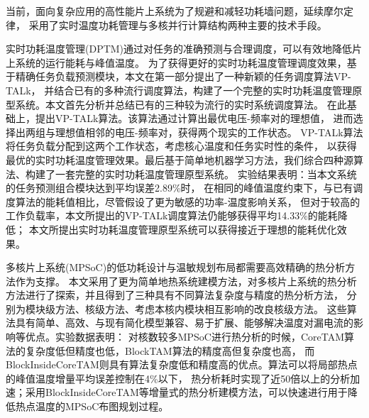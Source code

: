 

{}

\makeatother



\begin{cabstract}

当前，面向复杂应用的高性能片上系统为了规避和减轻功耗墙问题，延续摩尔定律， 采用了实时温度功耗管理与多核并行计算结构两种主要的技术手段。


实时功耗温度管理(DPTM)通过对任务的准确预测与合理调度，可以有效地降低片上系统的运行能耗与峰值温度。 为了获得更好的实时功耗温度管理调度效果，基于精确任务负载预测模块，本文在第一部分提出了一种新颖的任务调度算法VP-TALk， 并结合已有的多种流行调度算法，构建了一个完整的实时功耗温度管理原型系统。本文首先分析并总结已有的三种较为流行的实时系统调度算法。 在此基础上，提出VP-TALk算法。该算法通过计算出最优电压-频率对的理想值， 进而选择出两组与理想值相邻的电压-频率对，获得两个现实的工作状态。 VP-TALk算法将任务负载分配到这两个工作状态，考虑核心温度和任务实时性的条件， 以获得最优的实时功耗温度管理效果。最后基于简单地机器学习方法，我们综合四种源算法、构建了一套完整的实时功耗温度管理原型系统。 实验结果表明：当本文系统的任务预测组合模块达到平均误差2.89\%时，
在相同的峰值温度约束下，与已有调度算法的能耗值相比，尽管假设了更为敏感的功率-温度影响关系， 但对于较高的工作负载率，本文所提出的VP-TALk调度算法仍能够获得平均14.33\%的能耗降低；
本文所提出实时功耗温度管理原型系统可以获得接近于理想的能耗优化效果。


多核片上系统(MPSoC)的低功耗设计与温敏规划布局都需要高效精确的热分析方法作为支撑。 本文采用了更为简单地热系统建模方法，对多核片上系统的热分析方法进行了探索，并且得到了三种具有不同算法复杂度与精度的热分析方法， 分别为模块级方法、核级方法、考虑本核内模块相互影响的改良核级方法。 这些算法具有简单、高效、与现有简化模型兼容、易于扩展、能够解决温度对漏电流的影响等优点。实验数据表明：
对核数较多MPSoC进行热分析的时候，CoreTAM算法的复杂度低但精度也低，BlockTAM算法的精度高但复杂度也高， 而BlockInsideCoreTAM则具有算法复杂度低和精度高的优点。算法可以将局部热点的峰值温度增量平均误差控制在4\%以下， 热分析耗时实现了近50倍以上的分析加速；采用BlockInsideCoreTAM等增量式的热分析建模方法，可以快速进行用于降低热点温度的MPSoC布图规划过程。


\end{cabstract}

